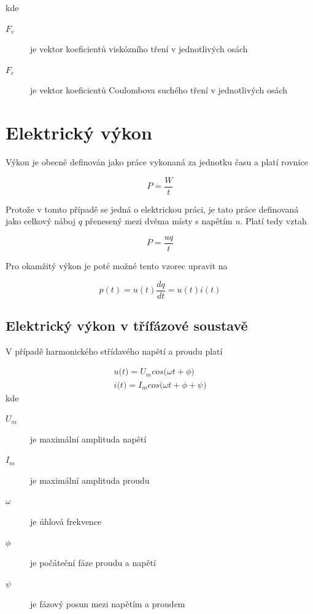 kde

\begin{description}
\item[$F_v$] je vektor koeficientů viskózního tření v jednotlivých osách
\item[$F_c$] je vektor koeficientů Coulombova suchého tření v jednotlivých osách
\end{description}

\section{Elektrický výkon}

Výkon je obecně definován jako práce vykonaná za jednotku času a platí rovnice

\begin{equation}
P = \frac{W}{t}
\end{equation}

Protože v tomto případě se jedná o elektrickou práci, je tato práce definovaná jako celkový náboj $q$ přenesený mezi dvěma místy s napětím $u$. Platí tedy vztah

\begin{equation}
P = \frac{uq}{t}
\end{equation}

Pro okamžitý výkon je poté možné tento vzorec upravit na

\begin{equation}
p(t) = u(t)\frac{dq}{dt} = u(t)i(t)
\end{equation}

\subsection{Elektrický výkon v třífázové soustavě}

V případě harmonického střídavého napětí a proudu platí

\begin{equation}
\begin{split}
u\big(t\big) = U_m cos\big(\omega t + \phi\big) \\
i\big(t\big) = I_m cos\big(\omega t + \phi + \psi\big)
\end{split}
\label{harm_curr_volt_eq}
\end{equation}  
kde
\begin{description}
\item[$U_m$] je maximální amplituda napětí
\item[$I_m$] je maximální amplituda proudu
\item[$\omega$] je úhlová frekvence
\item[$\phi$] je počáteční fáze proudu a napětí
\item[$\psi$] je fázový posun mezi napětím a proudem
\end{description}

